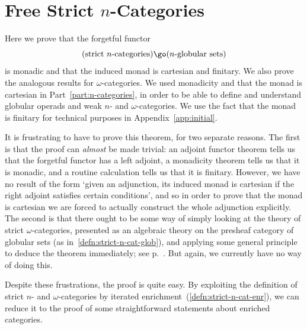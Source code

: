 
\chapter{Free Strict $n$-Categories}
%
%
%
%
%


\noindent
Here we prove that the forgetful functor
\[
(\textrm{strict } n \textrm{-categories} )
\go
(n\textrm{-globular sets})
\]
is monadic and that the induced monad is cartesian and finitary.  We also
prove the analogous results for $\omega$-categories.  We used monadicity
and that the monad is cartesian in Part~\ref{part:n-categories}, in order
to be able to define and understand globular operads and weak $n$- and
$\omega$-categories.  We use the fact that the monad is finitary for
technical purposes in Appendix~\ref{app:initial}.

It is frustrating to have to prove this theorem, for two separate reasons.
The first is that the proof can \emph{almost} be made trivial: an adjoint
functor theorem tells us that the forgetful functor has a left adjoint, a
monadicity theorem tells us that it is monadic, and a routine calculation
tells us that it is finitary.  However, we have no result of the form
`given an adjunction, its induced monad is cartesian if the right adjoint
satisfies certain conditions', and so in order to prove that the monad is
cartesian we are forced to actually construct the whole adjunction
explicitly.  The second is that there ought to be some way of simply
looking at the theory of strict $\omega$-categories, presented as an
algebraic theory on the presheaf category of globular sets (as
in~\ref{defn:strict-n-cat-glob}), and applying some general principle to
deduce the theorem immediately; see p.~\pageref{p:sr-presheaf}.  But
again, we currently have no way of doing this.

Despite these frustrations, the proof is quite easy.  By exploiting the
definition of strict $n$- and $\omega$-categories by iterated
enrichment~(\ref{defn:strict-n-cat-enr}), we can reduce it to the proof of
some straightforward statements about enriched categories.

